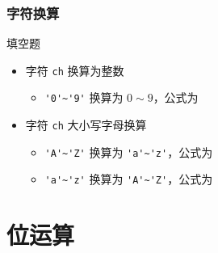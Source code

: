\begin{frame}[fragile]
    \frametitle{字符换算}

    \begin{exampleblock}{填空题}
        \begin{itemize}
            \item 字符 \lstinline|ch| 换算为整数
            
            \begin{itemize}
                \item \lstinline|'0'~'9'| 换算为 $0 \sim 9$，公式为  
            \end{itemize}
    
            \item 字符 \lstinline|ch| 大小写字母换算
            
            \begin{itemize}
                \item \lstinline|'A'~'Z'| 换算为 \lstinline|'a'~'z'|，公式为 
                \item \lstinline|'a'~'z'| 换算为 \lstinline|'A'~'Z'|，公式为 
            \end{itemize}
    
        \end{itemize}
    \end{exampleblock}

\end{frame}


\section{位运算}

